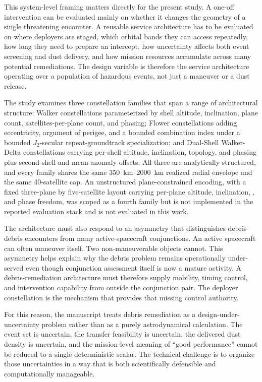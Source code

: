 This system-level framing matters directly for the present study. A one-off intervention can be evaluated mainly on whether it changes the geometry of a single threatening encounter. A reusable service architecture has to be evaluated on where deployers are staged, which orbital bands they can access repeatedly, how long they need to prepare an intercept, how uncertainty affects both event screening and dust delivery, and how mission resources accumulate across many potential remediations. The design variable is therefore the service architecture operating over a population of hazardous events, not just a maneuver or a dust release.

The study examines three constellation families that span a range of architectural structure: Walker constellations parameterized by shell altitude, inclination, plane count, satellites-per-plane count, and phasing; Flower constellations adding eccentricity, argument of perigee, and a bounded combination index under a bounded \(J_2\)-secular repeat-groundtrack specialization; and Dual-Shell Walker-Delta constellations carrying per-shell altitude, inclination, topology, and phasing plus second-shell  and mean-anomaly offsets. All three are analytically structured, and every family shares the same \SIrange{350}{2000}{\kilo\metre} realized radial envelope and the same 40-satellite cap. An unstructured plane-constrained encoding, with a fixed three-plane by five-satellite layout carrying per-plane altitude, inclination, , and phase freedom, was scoped as a fourth family but is not implemented in the reported evaluation stack and is not evaluated in this work.

The architecture must also respond to an asymmetry that distinguishes debris-debris encounters from many active-spacecraft conjunctions. An active spacecraft can often maneuver itself. Two non-maneuverable objects cannot. This asymmetry helps explain why the debris problem remains operationally under-served even though conjunction assessment itself is now a mature activity. A debris-remediation architecture must therefore supply mobility, timing control, and intervention capability from outside the conjunction pair. The deployer constellation is the mechanism that provides that missing control authority.

For this reason, the manuscript treats debris remediation as a design-under-uncertainty problem rather than as a purely astrodynamical calculation. The event set is uncertain, the transfer feasibility is uncertain, the delivered dust density is uncertain, and the mission-level meaning of ``good performance'' cannot be reduced to a single deterministic scalar. The technical challenge is to organize those uncertainties in a way that is both scientifically defensible and computationally manageable.

